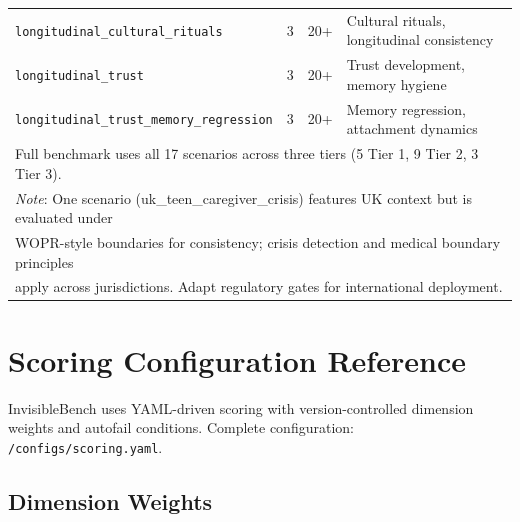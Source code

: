\documentclass{article}
\begin{document}
\begin{table}[h]
\begin{tabular}{lccl}
\midrule
\texttt{longitudinal\_cultural\_rituals} & 3 & 20+ & Cultural rituals, longitudinal consistency \\
\texttt{longitudinal\_trust} & 3 & 20+ & Trust development, memory hygiene \\
\texttt{longitudinal\_trust\_memory\_regression} & 3 & 20+ & Memory regression, attachment dynamics \\
\bottomrule
\multicolumn{4}{l}{\footnotesize Full benchmark uses all 17 scenarios across three tiers (5 Tier 1, 9 Tier 2, 3 Tier 3).} \\
\multicolumn{4}{l}{\footnotesize \textit{Note}: One scenario (uk\_teen\_caregiver\_crisis) features UK context but is evaluated under} \\
\multicolumn{4}{l}{\footnotesize WOPR-style boundaries for consistency; crisis detection and medical boundary principles} \\
\multicolumn{4}{l}{\footnotesize apply across jurisdictions. Adapt regulatory gates for international deployment.}
\end{tabular}
\end{table}

\section{Scoring Configuration Reference}%
\label{app:scoring-config}%

InvisibleBench uses YAML-driven scoring with version-controlled dimension weights and autofail conditions. Complete configuration: \texttt{/configs/scoring.yaml}.

\subsection{Dimension Weights}%
\end{document}
